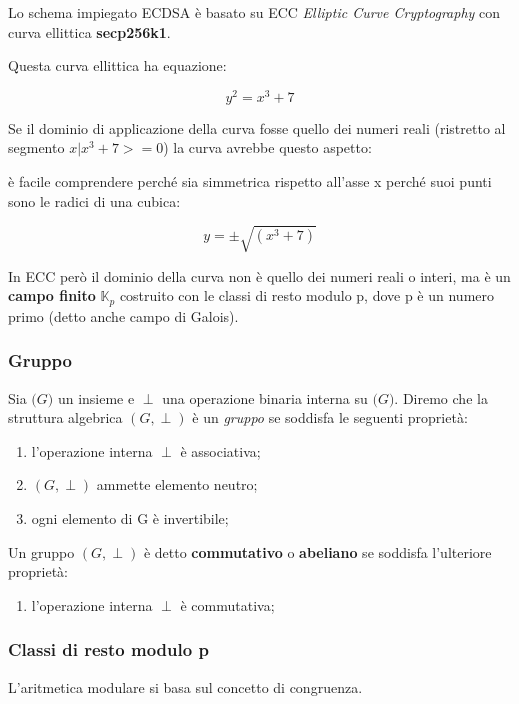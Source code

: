 \documentclass{article}
\begin{document}
Lo schema impiegato ECDSA è basato su ECC \textit{Elliptic Curve Cryptography} con curva ellittica \textbf{secp256k1}.

Questa curva ellittica ha equazione:

\begin{equation}
    y^2 = x^3 + 7
\end{equation}

Se il dominio di applicazione della curva fosse quello dei numeri reali (ristretto al segmento $x | x^3 + 7 >= 0$) la curva avrebbe questo aspetto:


è facile comprendere perché sia simmetrica rispetto all'asse x perché suoi punti sono le radici di una cubica:

$$
    y = \pm \sqrt{(x^3+7)}
$$

In ECC però il dominio della curva non è quello dei numeri reali o interi, ma è un \textbf{campo finito} $\mathbb{K}_{p}$ costruito con le classi di resto modulo p, dove p è un numero primo (detto anche campo di Galois).

\subsubsection{Gruppo}

Sia $\mathbb(G)$ un insieme e $\perp$ una operazione binaria interna su $\mathbb(G)$. Diremo che la struttura algebrica $(G, \perp)$ è un \textit{gruppo} se soddisfa le seguenti proprietà:

\begin{enumerate}[label=(G\arabic*.),itemindent=*]
    \item l'operazione interna $\perp$ è associativa;
    \item $(G, \perp)$ ammette elemento neutro;
    \item ogni elemento di G è invertibile;
\end{enumerate}

Un gruppo $(G, \perp)$ è detto \textbf{commutativo} o \textbf{abeliano} se soddisfa l'ulteriore proprietà:

\begin{enumerate}[label=(G\arabic*.),itemindent=*, resume]
    \item l'operazione interna $\perp$ è commutativa;
\end{enumerate}

\subsubsection{Classi di resto modulo p}
L'aritmetica modulare si basa sul concetto di congruenza.
\end{document}
